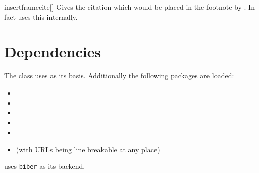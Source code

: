 \begin{describemacro}{insertframecite}[]
  Gives the citation which would be placed in the footnote by . In
  fact  uses this internally.
\end{describemacro}

\section{Dependencies}
The class uses  as its basis. Additionally the following packages
are loaded:
\vspace*{-\multicolsep}%
\begin{multicols}{3}
  \begin{itemize}
    \item {}
    \item {}
    \item {}
    \item {}
    \item \TikZ
    \item {} (with URLs being line breakable at any place)
  \end{itemize}
\end{multicols}
\vspace*{-\multicolsep}%
\noindent{} uses \texttt{biber} as its backend.
